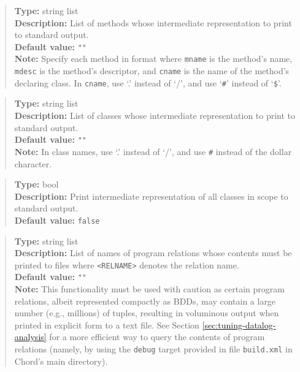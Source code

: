 \begin{quote}
{\bf Type:} string list  \\
{\bf Description:} List of methods whose intermediate representation to print to standard output. \\
{\bf Default value:} {\tt ""} \\
{\bf Note:} Specify each method in format  where {\tt mname} is the method's name, {\tt mdesc} is the method's descriptor, and {\tt cname} is the name of the method's declaring class. In {\tt cname}, use `.' instead of `/', and use `{\tt \#}' instead of `{\tt \$}'. 
\end{quote}

\begin{quote}
{\bf Type:} string list  \\
{\bf Description:} List of classes whose intermediate representation to print to standard output. \\
{\bf Default value:} {\tt ""} \\
{\bf Note:} In class names, use `.' instead of `/', and use {\tt \#} instead of the dollar character. 
\end{quote}

\begin{quote}
{\bf Type:} bool \\
{\bf Description:} Print intermediate representation of all classes in scope to standard output. \\
{\bf Default value:} {\tt false}
\end{quote}

\begin{quote}
{\bf Type:} string list  \\
{\bf Description:} List of names of program relations whose contents must be printed to files  where
{\tt <RELNAME>} denotes the relation name. \\
{\bf Default value:} {\tt ""} \\
{\bf Note:} This functionality must be used with caution as certain program relations, albeit represented compactly as BDDs, may contain
 a large number (e.g., millions) of tuples, resulting in voluminous output when printed in explicit form to a text file.  See Section
 \ref{sec:tuning-datalog-analysis} for a more efficient way to query the contents of program relations (namely, by using the {\tt debug}
 target provided in file {\tt build.xml} in Chord's main directory).
\end{quote}

